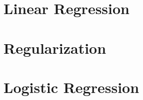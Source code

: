 \section[LinRegr]{Linear Regression}



\section[Regularize]{Regularization}


\section[LogiRegr]{Logistic Regression}



